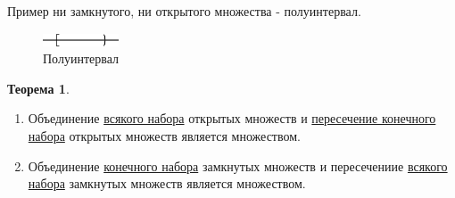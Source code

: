 \documentclass[12pt]{article}
\theoremstyle{definition}
\newtheorem{theorem}{Теорема}
\begin{document}
Пример ни замкнутого, ни открытого множества - полуинтервал.

\begin{figure}[H]
	\centering
	\includegraphics[width=0.2\textwidth]{11_6.eps}
	\caption{Полуинтервал}
	\label{11_6}
\end{figure}


\begin{theorem}\hfill
	\begin{enumerate}[label={\arabic*)}]
		\item Объединение \uline{всякого набора} открытых множеств и \uline{пересечение конечного набора} открытых множеств является  множеством.
		\item Объединение \uline{конечного набора} замкнутых множеств и пересечениие \uline{всякого набора} замкнутых множеств является  множеством.
	\end{enumerate}
\end{theorem}
\end{document}
